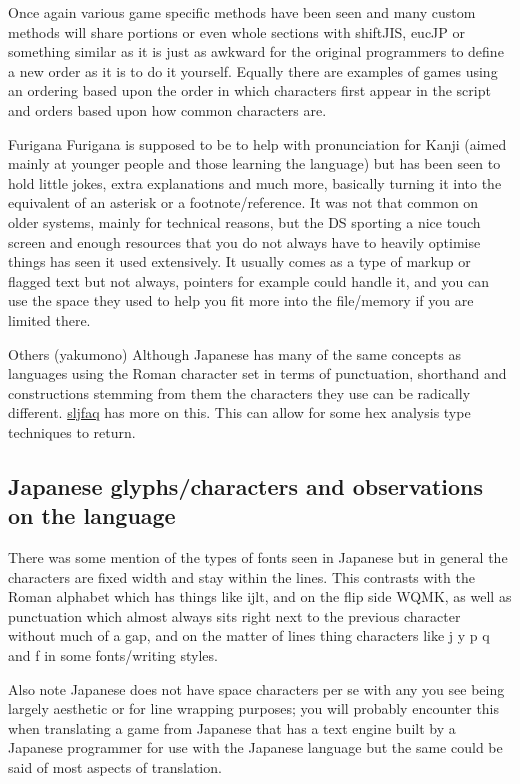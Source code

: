 \documentclass[
]{book}
\begin{document}
Once again various game specific methods have been seen and many custom methods will share portions or even whole sections with shiftJIS, eucJP or something similar as it is just as awkward for the original programmers to define a new order as it is to do it yourself. Equally there are examples of games using an ordering based upon the order in which characters first appear in the script and orders based upon how common characters are.

Furigana Furigana is supposed to be to help with pronunciation for Kanji (aimed mainly at younger people and those learning the language) but has been seen to hold little jokes, extra explanations and much more, basically turning it into the equivalent of an asterisk or a footnote/reference. It was not that common on older systems, mainly for technical reasons, but the DS sporting a nice touch screen and enough resources that you do not always have to heavily optimise things has seen it used extensively. It usually comes as a type of markup or flagged text but not always, pointers for example could handle it, and you can use the space they used to help you fit more into the file/memory if you are limited there.

Others (yakumono) Although Japanese has many of the same concepts as languages using the Roman character set in terms of punctuation, shorthand and constructions stemming from them the characters they use can be radically different. \href{http://www.sljfaq.org/afaq/symbol.html}{sljfaq} has more on this. This can allow for some hex analysis type techniques to return.

\hypertarget{japanese-glyphscharacters-and-observations-on-the-language}{%
\subsection{Japanese glyphs/characters and observations on the language}\label{japanese-glyphscharacters-and-observations-on-the-language}}

There was some mention of the types of fonts seen in Japanese but in general the characters are fixed width and stay within the lines. This contrasts with the Roman alphabet which has things like ijlt, and on the flip side WQMK, as well as punctuation which almost always sits right next to the previous character without much of a gap, and on the matter of lines thing characters like j y p q and f in some fonts/writing styles.

Also note Japanese does not have space characters per se with any you see being largely aesthetic or for line wrapping purposes; you will probably encounter this when translating a game from Japanese that has a text engine built by a Japanese programmer for use with the Japanese language but the same could be said of most aspects of translation.
\end{document}
